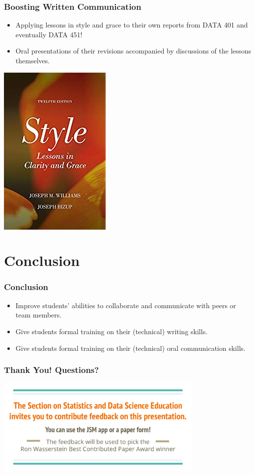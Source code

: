 \documentclass[xcolor={dvipsnames}]{beamer}
\newcommand{\ft}{\frametitle}
\newcommand{\bi}{\begin{itemize}}
\newcommand{\ei}{\end{itemize}}
\begin{document}
\begin{frame}
\ft{Boosting Written Communication}
\bi
	\item Applying lessons in style and grace to their own reports from DATA 401 and eventually DATA 451!
	\pause
	\item Oral presentations of their revisions accompanied by discussions of the lessons themselves.
\ei
\begin{center}
	\includegraphics[width = .25\textwidth]{styleandgrace_book.jpg}
\end{center}
\end{frame}

\section{Conclusion}

\begin{frame}
\ft{Conclusion}
\bi
	\item Improve students' abilities to collaborate and communicate with peers or team members.
	\pause
	\item Give students formal training on their (technical) writing skills.
	\pause
	\item Give students formal training on their (technical) oral communication skills.
\ei
\end{frame}

\begin{frame}
\frametitle{Thank You! Questions?}
\begin{center}
	\includegraphics[width = 4in]{lastslide_survey.png}
\end{center}
\end{frame}
\end{document}
